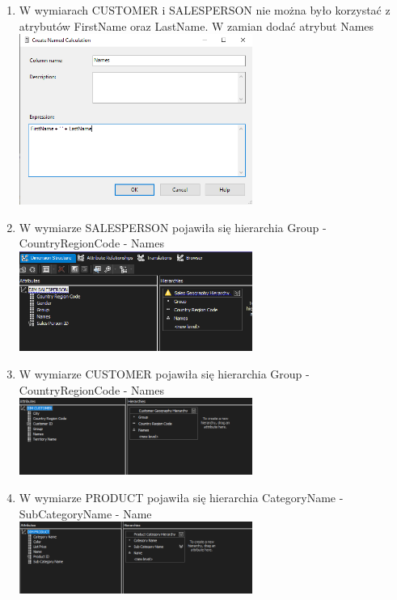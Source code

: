 \documentclass[a4paper,12pt]{article}
\begin{document}
\begin{enumerate}
  \item W wymiarach CUSTOMER i SALESPERSON nie można było korzystać z atrybutów FirstName oraz LastName. W zamian dodać atrybut Names\\
        \includegraphics[width=0.6\textwidth]{images/1a1.png}

  \item W wymiarze SALESPERSON pojawiła się hierarchia Group - CountryRegionCode - Names\\
        \includegraphics[width=0.6\textwidth]{images/1a2.png}

  \item W wymiarze CUSTOMER pojawiła się hierarchia Group - CountryRegionCode - Names\\
        \includegraphics[width=0.6\textwidth]{images/1a3.png}

  \item W wymiarze PRODUCT pojawiła się hierarchia CategoryName - SubCategoryName - Name\\
        \includegraphics[width=0.6\textwidth]{images/1a4.png}


\end{enumerate}
\end{document}
